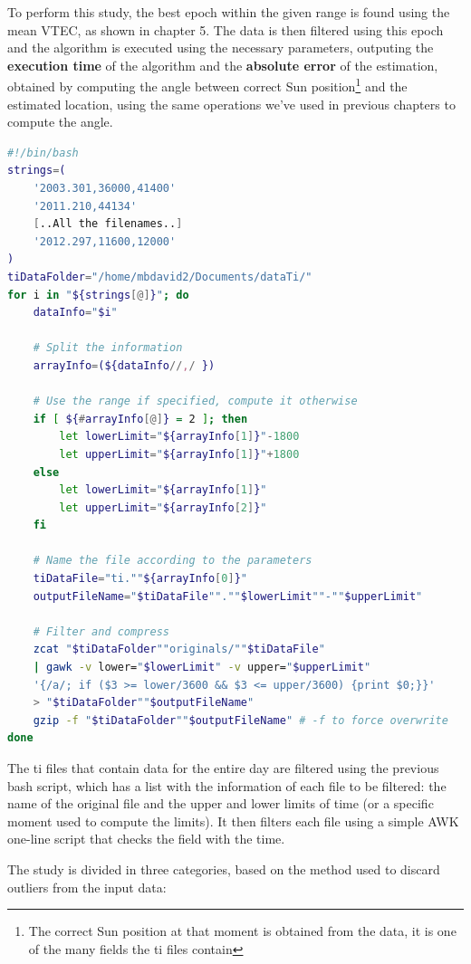 To perform this study, the best epoch within the given range is found using the mean VTEC, as shown in chapter 5. The data is then filtered using this epoch and the algorithm is executed using the necessary parameters, outputing the \textbf{execution time} of the algorithm and the \textbf{absolute error} of the estimation, obtained by computing the angle between correct Sun position\footnote{The correct Sun position at that moment is obtained from the data, it is one of the many fields the ti files contain} and the estimated location, using the same operations we've used in previous chapters to compute the angle. 

\begin{minipage}{\linewidth}
	\begin{lstlisting}[language=Bash, caption=Filtering the ti file]
#!/bin/bash	
strings=(
	'2003.301,36000,41400'
	'2011.210,44134'
	[..All the filenames..] 
	'2012.297,11600,12000'
)
tiDataFolder="/home/mbdavid2/Documents/dataTi/"
for i in "${strings[@]}"; do
	dataInfo="$i"
	
	# Split the information
	arrayInfo=(${dataInfo//,/ })
	
	# Use the range if specified, compute it otherwise
	if [ ${#arrayInfo[@]} = 2 ]; then
		let lowerLimit="${arrayInfo[1]}"-1800
		let upperLimit="${arrayInfo[1]}"+1800
	else
		let lowerLimit="${arrayInfo[1]}"
		let upperLimit="${arrayInfo[2]}"
	fi
	
	# Name the file according to the parameters
	tiDataFile="ti.""${arrayInfo[0]}"
	outputFileName="$tiDataFile"".""$lowerLimit""-""$upperLimit"
	
	# Filter and compress
	zcat "$tiDataFolder""originals/""$tiDataFile" 
	| gawk -v lower="$lowerLimit" -v upper="$upperLimit" 
	'{/a/; if ($3 >= lower/3600 && $3 <= upper/3600) {print $0;}}' 
	> "$tiDataFolder""$outputFileName"
	gzip -f "$tiDataFolder""$outputFileName" # -f to force overwrite
done\end{lstlisting}
\end{minipage}

The ti files that contain data for the entire day are filtered using the previous bash script, which has a list with the information of each file to be filtered: the name of the original file and the upper and lower limits of time (or a specific moment used to compute the limits). It then filters each file using a simple AWK one-line script that checks the field with the time.

The study is divided in three categories, based on the method used to discard outliers from the input data:

